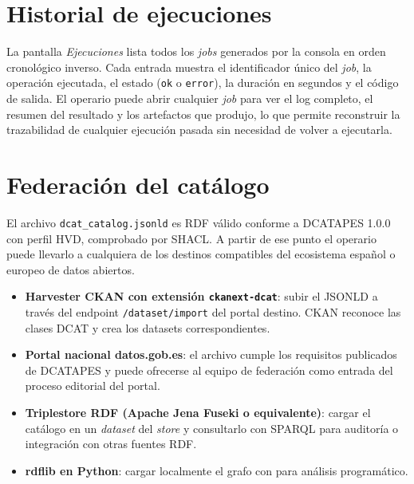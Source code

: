 
\section{Historial de ejecuciones}\label{sec:demo-ejecuciones}

La pantalla \emph{Ejecuciones} lista todos los \emph{jobs} generados por la consola en orden cronológico inverso. Cada entrada muestra el identificador único del \emph{job}, la operación ejecutada, el estado (\texttt{ok} o \texttt{error}), la duración en segundos y el código de salida. El operario puede abrir cualquier \emph{job} para ver el log completo, el resumen del resultado y los artefactos que produjo, lo que permite reconstruir la trazabilidad de cualquier ejecución pasada sin necesidad de volver a ejecutarla.


\section{Federación del catálogo}\label{sec:demo-federacion}

El archivo \texttt{dcat\_catalog.jsonld} es \ac{RDF} válido conforme a \ac{DCATAPES} 1.0.0 con perfil \ac{HVD}, comprobado por \ac{SHACL}. A partir de ese punto el operario puede llevarlo a cualquiera de los destinos compatibles del ecosistema español o europeo de datos abiertos.

\begin{itemize}
    \item \textbf{Harvester CKAN con extensión \texttt{ckanext-dcat}}: subir el \ac{JSONLD} a través del endpoint \texttt{/dataset/import} del portal destino. CKAN reconoce las clases \ac{DCAT} y crea los datasets correspondientes.
    \item \textbf{Portal nacional datos.gob.es}: el archivo cumple los requisitos publicados de \ac{DCATAPES} y puede ofrecerse al equipo de federación como entrada del proceso editorial del portal.
    \item \textbf{Triplestore RDF (Apache Jena Fuseki o equivalente)}: cargar el catálogo en un \emph{dataset} del \emph{store} y consultarlo con \ac{SPARQL} para auditoría o integración con otras fuentes \ac{RDF}.
    \item \textbf{rdflib en Python}: cargar localmente el grafo con  para análisis programático.
\end{itemize}


